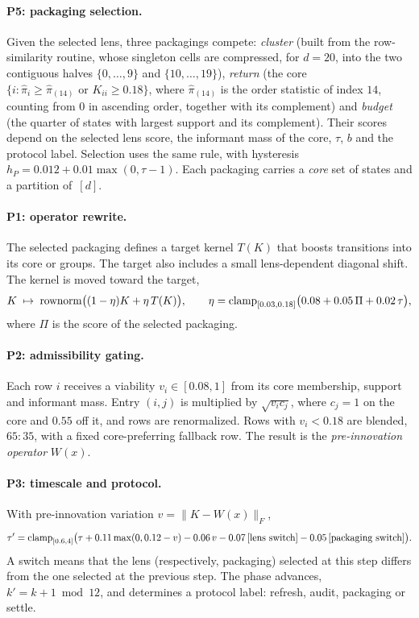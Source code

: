 \paragraph{P5: packaging selection.}
Given the selected lens, three packagings compete: \emph{cluster} (built from the row-similarity routine, whose singleton cells are compressed, for $d=20$, into the two contiguous halves $\{0,\dots,9\}$ and $\{10,\dots,19\}$), \emph{return} (the core $\{i:\hat\pi_i\ge\hat\pi_{(14)}\text{ or }K_{ii}\ge0.18\}$, where $\hat\pi_{(14)}$ is the order statistic of index $14$, counting from $0$ in ascending order, together with its complement) and \emph{budget} (the quarter of states with largest support and its complement). Their scores depend on the selected lens score, the informant mass of the core, $\tau$, $b$ and the protocol label. Selection uses the same rule, with hysteresis $h_P=0.012+0.01\max(0,\tau-1)$. Each packaging carries a \emph{core} set of states and a partition of~$[d]$.

\paragraph{P1: operator rewrite.}
The selected packaging defines a target kernel $T(K)$ that boosts transitions into its core or groups. The target also includes a small lens-dependent diagonal shift. The kernel is moved toward the target,
\[
K\;\mapsto\;\operatorname{rownorm}\bigl((1-\eta)K+\eta\,T(K)\bigr),\qquad
\eta=\operatorname{clamp}_{[0.03,0.18]}\bigl(0.08+0.05\,\Pi+0.02\,\tau\bigr),
\]
where $\Pi$ is the score of the selected packaging.

\paragraph{P2: admissibility gating.}
Each row $i$ receives a viability $v_i\in[0.08,1]$ from its core membership, support and informant mass. Entry $(i,j)$ is multiplied by $\sqrt{v_i c_j}$, where $c_j=1$ on the core and $0.55$ off it, and rows are renormalized. Rows with $v_i<0.18$ are blended, $65{:}35$, with a fixed core-preferring fallback row. The result is the \emph{pre-innovation operator} $W(x)$.

\paragraph{P3: timescale and protocol.}
With pre-innovation variation $v=\lVert K-W(x)\rVert_F$,
\[
\tau'=\operatorname{clamp}_{[0.6,4]}\bigl(\tau+0.11\max(0,0.12-v)-0.06\,v-0.07\,[\text{lens switch}]-0.05\,[\text{packaging switch}]\bigr).
\]
A switch means that the lens (respectively, packaging) selected at this step differs from the one selected at the previous step. The phase advances, $k'=k+1\bmod 12$, and determines a protocol label: refresh, audit, packaging or settle.

